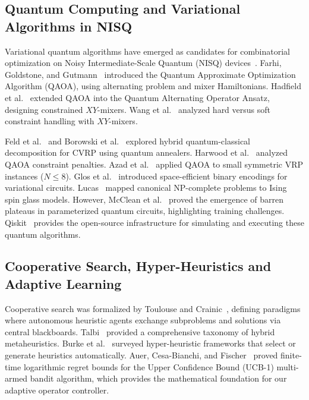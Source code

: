 \subsection{Quantum Computing and Variational Algorithms in NISQ}
Variational quantum algorithms have emerged as candidates for combinatorial optimization on Noisy Intermediate-Scale Quantum (NISQ) devices~\cite{preskill2018quantum}. Farhi, Goldstone, and Gutmann~\cite{farhi2014qaoa} introduced the Quantum Approximate Optimization Algorithm (QAOA), using alternating problem and mixer Hamiltonians. Hadfield et al.~\cite{hadfield2019qaoa} extended QAOA into the Quantum Alternating Operator Ansatz, designing constrained $XY$-mixers. Wang et al.~\cite{wang2020xy} analyzed hard versus soft constraint handling with $XY$-mixers. 

Feld et al.~\cite{feld2019hybrid} and Borowski et al.~\cite{borowski2020new} explored hybrid quantum-classical decomposition for CVRP using quantum annealers. Harwood et al.~\cite{harwood2021formulating} analyzed QAOA constraint penalties. Azad et al.~\cite{azad2022solving} applied QAOA to small symmetric VRP instances ($N \le 8$). Glos et al.~\cite{glos2022space} introduced space-efficient binary encodings for variational circuits. Lucas~\cite{lucas2014ising} mapped canonical NP-complete problems to Ising spin glass models. However, McClean et al.~\cite{mcclean2018barren} proved the emergence of barren plateaus in parameterized quantum circuits, highlighting training challenges. Qiskit~\cite{qiskit2024} provides the open-source infrastructure for simulating and executing these quantum algorithms.

\subsection{Cooperative Search, Hyper-Heuristics and Adaptive Learning}
Cooperative search was formalized by Toulouse and Crainic~\cite{toulouse2004cooperative}, defining paradigms where autonomous heuristic agents exchange subproblems and solutions via central blackboards. Talbi~\cite{talbi2009metaheuristics} provided a comprehensive taxonomy of hybrid metaheuristics. Burke et al.~\cite{burke2013hyper} surveyed hyper-heuristic frameworks that select or generate heuristics automatically. Auer, Cesa-Bianchi, and Fischer~\cite{auer2002finite} proved finite-time logarithmic regret bounds for the Upper Confidence Bound (UCB-1) multi-armed bandit algorithm, which provides the mathematical foundation for our adaptive operator controller.

